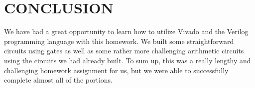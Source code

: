 \documentclass[pdftex,12pt,a4paper]{article}
\begin{document}
\section{CONCLUSION}
We have had a great opportunity to learn how to utilize Vivado and the Verilog programming language with this homework. We built some straightforward circuits using gates as well as some rather more challenging arithmetic circuits using the circuits we had already built. To sum up, this was a really lengthy and challenging homework assignment for us, but we were able to successfully complete almost all of the portions.
\end{document}
